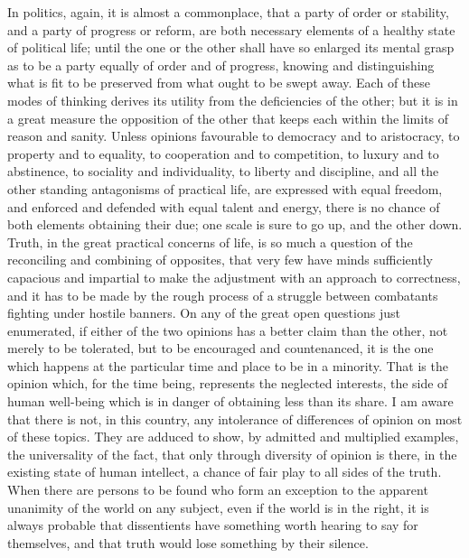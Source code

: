 \documentclass[11pt,openany]{book}
\begin{document}
In politics, again, it is almost a commonplace, that a party of order or stability, and a party of progress or reform, are both necessary elements of a healthy state of political life; until the one or the other shall have so enlarged its mental grasp as to be a party equally of order and of progress, knowing and distinguishing what is fit to be preserved from what ought to be swept away. Each of these modes of thinking derives its utility from the deficiencies of the other; but it is in a great measure the opposition of the other that keeps each within the limits of reason and sanity. Unless opinions favourable to democracy and to aristocracy, to property and to equality, to cooperation and to competition, to luxury and to abstinence, to sociality and individuality, to liberty and discipline, and all the other standing antagonisms of practical life, are expressed with equal freedom, and enforced and defended with equal talent and energy, there is no chance of both elements obtaining their due; one scale is sure to go up, and the other down. Truth, in the great practical concerns of life, is so much a question of the reconciling and combining of opposites, that very few have minds sufficiently capacious and impartial to make the adjustment with an approach to correctness, and it has to be made by the rough process of a struggle between combatants fighting under hostile banners. On any of the great open questions just enumerated, if either of the two opinions has a better claim than the other, not merely to be tolerated, but to be encouraged and countenanced, it is the one which happens at the particular time and place to be in a minority. That is the opinion which, for the time being, represents the neglected interests, the side of human well-being which is in danger of obtaining less than its share. I am aware that there is not, in this country, any intolerance of differences of opinion on most of these topics. They are adduced to show, by admitted and multiplied examples, the universality of the fact, that only through diversity of opinion is there, in the existing state of human intellect, a chance of fair play to all sides of the truth. When there are persons to be found who form an exception to the apparent unanimity of the world on any subject, even if the world is in the right, it is always probable that dissentients have something worth hearing to say for themselves, and that truth would lose something by their silence.
\end{document}
